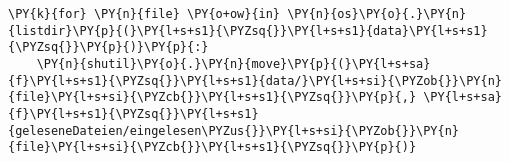     \begin{tcolorbox}[breakable, size=fbox, boxrule=1pt, pad at break*=1mm,colback=cellbackground, colframe=cellborder]
\begin{Verbatim}[commandchars=\\\{\}]
\PY{k}{for} \PY{n}{file} \PY{o+ow}{in} \PY{n}{os}\PY{o}{.}\PY{n}{listdir}\PY{p}{(}\PY{l+s+s1}{\PYZsq{}}\PY{l+s+s1}{data}\PY{l+s+s1}{\PYZsq{}}\PY{p}{)}\PY{p}{:}
    \PY{n}{shutil}\PY{o}{.}\PY{n}{move}\PY{p}{(}\PY{l+s+sa}{f}\PY{l+s+s1}{\PYZsq{}}\PY{l+s+s1}{data/}\PY{l+s+si}{\PYZob{}}\PY{n}{file}\PY{l+s+si}{\PYZcb{}}\PY{l+s+s1}{\PYZsq{}}\PY{p}{,} \PY{l+s+sa}{f}\PY{l+s+s1}{\PYZsq{}}\PY{l+s+s1}{geleseneDateien/eingelesen\PYZus{}}\PY{l+s+si}{\PYZob{}}\PY{n}{file}\PY{l+s+si}{\PYZcb{}}\PY{l+s+s1}{\PYZsq{}}\PY{p}{)}
\end{Verbatim}
\end{tcolorbox}


    
    
    

